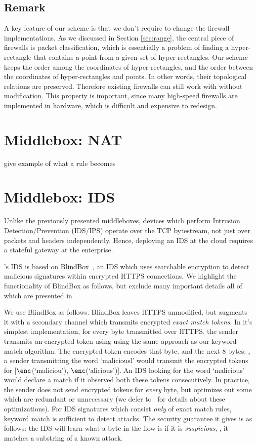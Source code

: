 \subsection{Remark}
A key feature of our scheme is that we don't require to change the firewall implementations. As we discussed in Section \ref{sec:range}, the central 
piece of firewalls is packet classification, which is essentially a problem of finding a hyper-rectangle that contains a point from a given set of hyper-rectangles. Our \RM scheme keeps the order among the coordinates of hyper-rectangles, and the order between the coordinates of hyper-rectangles and points. In other words, their topological relations are preserved. Therefore existing firewalls can still work with \sys without modification. This property is important, since many high-speed firewalls are implemented in hardware, which is difficult and expensive to redesign.

\section{Middlebox: NAT}\label{sec:nat}

give example of what a rule becomes

\section{Middlebox: IDS}\label{sec:ids}
Unlike the previously presented middleboxes, devices which perform Intrusion Detection/Prevention (IDS/IPS) operate over the TCP bytestream, not just over packets and headers independently.
Hence, deploying an IDS at the cloud requires a stateful gateway at the enterprise.

\sys's IDS is based on BlindBox~\cite{blindbox}, an IDS which uses searchable encryption to detect malicious signatures within encrypted HTTPS connections. We highlight the functionality of BlindBox as follows, but exclude many important details all of which are presented in~\cite{blindbox}

We use BlindBox as follows.
BlindBox leaves HTTPS unmodified, but augments it with a secondary channel which transmits encrypted {\it exact match tokens}.
In it's simplest implementation, for every byte transmitted over HTTPS, the sender transmits an encrypted token using using the same approach as our keyword match algorithm.
The encrypted token encodes that byte, and the next 8 bytes; \eg{}, a sender transmitting the word `maliciousl' would transmit the encrypted tokens for [$\enc$(`maliciou'), $\enc$(`alicious')].
An IDS looking for the word `malicious' would declare a match if it observed both these tokens consecutively.
In practice, the sender does not send encrypted tokens for {\it every} byte, but optimizes out some which are redundant or unnecessary (we defer to~\cite{blindbox} for details about these optimizations).
For IDS signatures which consist {\it only} of exact match rules, keyword match is sufficient to detect attacks.
The security guarantee it gives is as follows: the IDS will learn what a byte in the flow is if it is {\it suspicious}, \ie{}, it matches a substring of a known attack.

